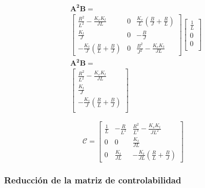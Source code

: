 \begin{equation*}
  \begin{aligned}
    &\mathbf{A^2B} =\\
    &\begin{bmatrix}
       \tfrac{R^2}{L^2} - \tfrac{K_e K_t}{JL}                 & 0 & \tfrac{K_e}{L}\left(\tfrac{B}{J} + \tfrac{R}{L}\right) \\
       \tfrac{K_t}{J}                                         & 0 & -\tfrac{B}{J}                                          \\
      -\tfrac{K_t}{J}\left(\tfrac{R}{L} + \tfrac{B}{J}\right) & 0 & \tfrac{B^2}{J^2} - \tfrac{K_e K_t}{JL}
    \end{bmatrix}
    \begin{bmatrix}
      \frac{1}{L} \\
      0\\
      0\\
    \end{bmatrix} \\
    &\mathbf{A^2B} =\\
    &\begin{bmatrix}
       \tfrac{R^2}{L^2} - \tfrac{K_e K_t}{JL}                 \\
       \tfrac{K_t}{J}                                         \\
      -\tfrac{K_t}{J}\left(\tfrac{R}{L} + \tfrac{B}{J}\right) \\
    \end{bmatrix}
  \end{aligned}
\end{equation*}

\begin{equation}
  \mathcal{C} = 
  \begin{bmatrix}
    \tfrac{1}{L}     & -\tfrac{R}{L^2}  & \tfrac{R^2}{L^3} - \tfrac{K_e K_t}{JL^2}                  \\
    0                & 0                & \tfrac{K_t}{JL}                                           \\
    0                & \tfrac{K_t}{JL}  & -\tfrac{K_t}{JL}\left( \tfrac{R}{L} + \tfrac{B}{J} \right)
  \end{bmatrix}
  \label{eq:MatrizControlabilidadMotor}
\end{equation}

\subsubsection{Reducción de la matriz de controlabilidad}

